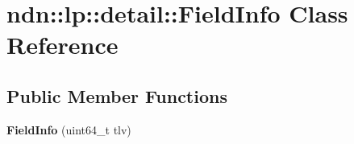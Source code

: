 \hypertarget{classndn_1_1lp_1_1detail_1_1FieldInfo}{}\section{ndn\+:\+:lp\+:\+:detail\+:\+:Field\+Info Class Reference}
\label{classndn_1_1lp_1_1detail_1_1FieldInfo}
\subsection*{Public Member Functions}
\begin{DoxyCompactItemize}
\item 
{\bfseries Field\+Info} (uint64\+\_\+t tlv)\hypertarget{classndn_1_1lp_1_1detail_1_1FieldInfo_a0a8c2ed8dc6ade12419095fde7f2b186}{}\label{classndn_1_1lp_1_1detail_1_1FieldInfo_a0a8c2ed8dc6ade12419095fde7f2b186}

\end{DoxyCompactItemize}
